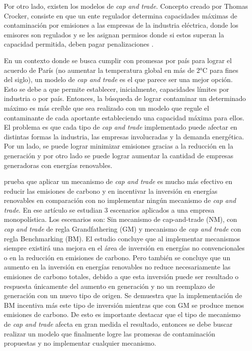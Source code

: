 Por otro lado, existen los modelos de \textit{cap and trade}. Concepto creado por Thomas Crocker, consiste en que un ente regulador determina capacidades máximas de contaminación por emisiones a las empresas de la industria eléctrica, donde los emisores son regulados y se les asignan permisos donde si estos superan la capacidad permitida, deben pagar penalizaciones . 
\vspace{2.5mm}

En un contexto donde se busca cumplir con promesas por país para lograr el acuerdo de París (no aumentar la temperatura global en más de 2°C para fines del siglo), un modelo de \textit{cap and trade} es el que parece ser una mejor opción. Esto se debe a que permite establecer, inicialmente, capacidades límites por industria o por país. Entonces, la búsqueda de lograr contaminar un determinado máximo es más creíble que sea realizado con un modelo que regule el contaminante de cada aportante estableciendo una capacidad máxima para ellos. El problema es que cada tipo de \textit{cap and trade} implementado puede afectar en distintas formas la industria, las empresas involucradas y la demanda energética. Por un lado, se puede lograr minimizar emisiones gracias a la reducción en la generación y por otro lado se puede lograr aumentar la cantidad de empresas generadoras con energías renovables.
\vspace{2.5mm}

 prueba que aplicar un mecanismo de \textit{cap and trade} es mucho más efectivo en reducir las emisiones de carbono y en incentivar la inversión en energías renovables en comparación con no implementar ningún mecanismo de \textit{cap and trade}. En ese artículo se estudian 3 escenarios aplicados a una empresa monopolística. Los escenarios son: Sin mecanismo de cap-and-trade (NM), con \textit{cap and trade} de regla Grandfathering (GM) y mecanismo de \textit{cap and trade} con regla Benchmarking (BM). El estudio concluye que al implementar mecanismos siempre existirá una mejora en el área de inversión en energías no convencionales o en la reducción en emisiones de carbono. Pero también se concluye que un aumento en la inversión en energías renovables no reduce necesariamente las emisiones de carbono totales, debido a que esta inversión puede ser resultado o respuesta únicamente del aumento en generación y no un reemplazo de generación con un nuevo tipo de origen. Se demuestra que la implementación de BM incentiva más este tipo de inversión mientras que con GM se produce menos emisiones de carbono. De esto es importante destacar que el tipo de mecanismo de \textit{cap and trade} afecta en gran medida el resultado, entonces se debe buscar realizar un modelo que finalmente logre las promesas de contaminación propuestas y no implementar cualquier mecanismo. 
\vspace{2.5mm}

